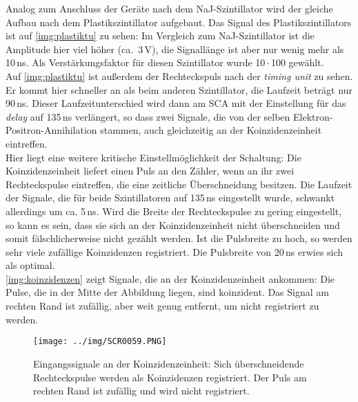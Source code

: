 Analog zum Anschluss der Geräte nach dem NaJ-Szintillator wird der gleiche Aufbau nach dem Plastikszintillator
aufgebaut. Das Signal des Plastikszintillators ist auf \autoref{img:plastiktu} zu sehen:
Im Vergleich zum NaJ-Szintillator ist die Amplitude hier viel höher (ca.~3\,V),
die Signallänge ist aber nur wenig mehr als 10\,ns.
Als Verstärkungsfaktor für diesen Szintillator wurde 10\,$\cdot$\,100 gewählt.\\
Auf \autoref{img:plastiktu} ist außerdem der Rechteckspuls nach der \emph{timing unit} zu sehen.
Er kommt hier schneller an als beim anderen Szintillator, 
die Laufzeit beträgt nur 90\,ns. Dieser Laufzeitunterschied wird dann am SCA mit der
Einstellung für das \emph{delay} auf 135\,ns verlängert, so dass zwei Signale, die von der selben
Elektron-Positron-Annihilation stammen, auch gleichzeitig an der Koinzidenzeinheit eintreffen.\\
Hier liegt eine weitere kritische Einstellmöglichkeit der Schaltung:
Die Koinzidenzeinheit liefert einen Puls an den Zähler, wenn an ihr zwei Rechteckspulse eintreffen,
die eine zeitliche Überschneidung besitzen.
Die Laufzeit der Signale, die für beide Szintillatoren auf 135\,ns eingestellt wurde,
schwankt allerdings um ca. 5\,ns. Wird die Breite der Rechteckspulse zu gering eingestellt, so
kann es sein, dass sie sich an der Koinzidenzeinheit nicht überschneiden und somit fälschlicherweise nicht
gezählt werden. Ist die Pulsbreite zu hoch, so werden sehr viele zufällige Koinzidenzen registriert.
Die Pulsbreite von 20\,ns erwies sich als optimal.\\
\autoref{img:koinzidenzen} zeigt Signale, die an der Koinzidenzeinheit ankommen:
Die Pulse, die in der Mitte der Abbildung liegen, sind koinzident.
Das Signal am rechten Rand ist zufällig, aber weit genug entfernt, um nicht registriert zu werden.
\begin{figure}[H]
\begin{center}
  \texttt{[image: ../img/SCR0059.PNG]}
  \caption[---]{Eingangssignale an der Koinzidenzeinheit: Sich überschneidende Rechteckspulse werden als 
  Koinzidenzen registriert. Der Puls am rechten Rand ist zufällig und wird nicht registriert.}
  \label{img:koinzidenzen}
\end{center}
\end{figure}